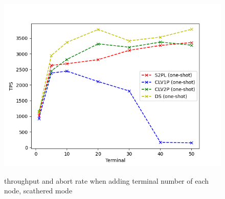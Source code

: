 \documentclass[conference]{IEEEtran}
\begin{document}
\begin{figure}[htbp]
      { \includegraphics[scale=0.25] {figure/tps_plot_add_terminal} \label{fig:tps_add_terminal}}
\caption{throughput and abort rate when adding terminal number of each node, scathered mode}
\label{fig:add_terminal_scathered_mode}
\end{figure}
\end{document}
